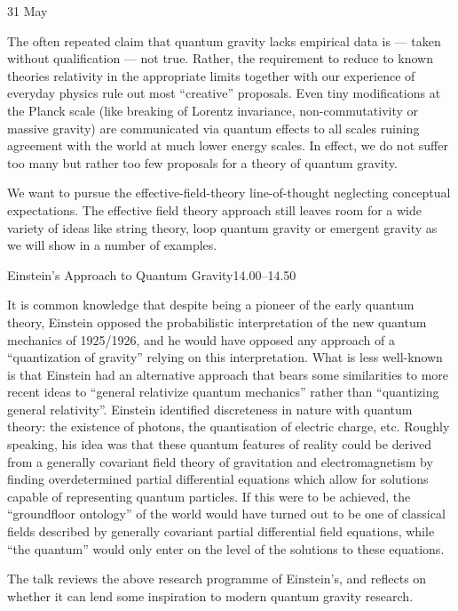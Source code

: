 \documentclass{conference}
\begin{document}
\begin{Day}{31 May}
{The often repeated claim that quantum gravity lacks empirical data is --- taken without qualification --- not true. Rather, the requirement to reduce to known theories relativity in the appropriate limits together with our experience of everyday physics rule out most “creative” proposals.  Even tiny modifications at the Planck scale (like breaking of Lorentz invariance, non-commutativity or massive gravity) are communicated via quantum effects to all scales ruining agreement with the world at much lower energy scales. In effect, we do not suffer too many but rather too few proposals for a theory of quantum gravity.

We want to pursue the effective-field-theory line-of-thought neglecting conceptual expectations. The effective field theory approach still leaves room for a wide variety of ideas like string theory, loop quantum gravity or emergent gravity as we will show in a number of examples.}


    {Einstein's Approach to Quantum Gravity}{14.00--14.50}
    {It is common knowledge that despite being a pioneer of the early quantum theory, Einstein opposed the probabilistic interpretation of the new quantum mechanics of 1925/1926, and he would have opposed any approach of a “quantization of gravity” relying on this interpretation. What is less well-known is that Einstein had an alternative approach that bears some similarities to more recent ideas to “general relativize quantum mechanics” rather than “quantizing general relativity”. Einstein identified discreteness in nature with quantum theory: the existence of photons, the quantisation of electric charge, etc. Roughly speaking, his idea was that these quantum features of reality could be derived from a generally covariant field theory of gravitation and electromagnetism by finding overdetermined partial differential equations which allow for solutions capable of representing quantum particles. If this were to be achieved, the “groundfloor ontology” of the world would have turned out to be one of classical fields described by generally covariant partial differential field equations, while “the quantum” would only enter on the level of the solutions to these equations.

The talk reviews the above research programme of Einstein’s, and reflects on whether it can lend some inspiration to modern quantum gravity research.}


\end{Day}
\end{document}
